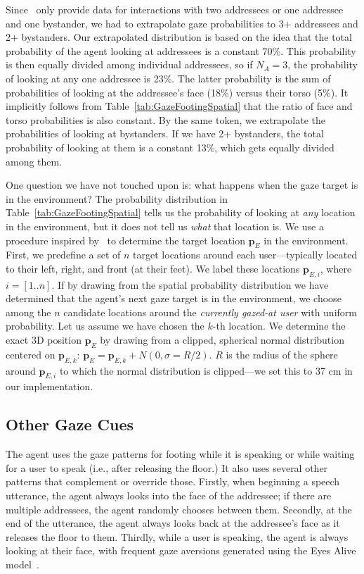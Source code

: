 Since~\citet{mutlu2012conversational} only provide data for interactions with two addressees or one addressee and one bystander, we had to extrapolate gaze probabilities to 3+ addressees and 2+ bystanders. Our extrapolated distribution is based on the idea that the total probability of the agent looking at addressees is a constant 70\%. This probability is then equally divided among individual addressees, so if $N_A = 3$, the probability of looking at any one addressee is 23\%. The latter probability is the sum of probabilities of looking at the addressee's face (18\%) versus their torso (5\%). It implicitly follows from Table~\ref{tab:GazeFootingSpatial} that the ratio of face and torso probabilities is also constant. By the same token, we extrapolate the probabilities of looking at bystanders. If we have 2+ bystanders, the total probability of looking at them is a constant 13\%, which gets equally divided among them.

One question we have not touched upon is: what happens when the gaze target is in the environment? The probability distribution in Table~\ref{tab:GazeFootingSpatial} tells us the probability of looking at \emph{any} location in the environment, but it does not tell us \emph{what} that location is. We use a procedure inspired by~\citep{mutlu2012conversational} to determine the target location $\mathbf{p}_E$ in the environment. First, we predefine a set of $n$ target locations around each user---typically located to their left, right, and front (at their feet). We label these locations $\mathbf{p}_{E,i}$, where $i = [1..n]$. If by drawing from the spatial probability distribution we have determined that the agent's next gaze target is in the environment, we choose among the $n$ candidate locations around the \emph{currently gazed-at user} with uniform probability. Let us assume we have chosen the $k$-th location. We determine the exact 3D position $\mathbf{p}_E$ by drawing from a clipped, spherical normal distribution centered on $\mathbf{p}_{E,k}$: $\mathbf{p}_E = \mathbf{p}_{E,k} + N(0, \sigma = R/2)$. $R$ is the radius of the sphere around $\mathbf{p}_{E,i}$ to which the normal distribution is clipped---we set this to 37 cm in our implementation.

\subsection{Other Gaze Cues}

The agent uses the gaze patterns for footing while it is speaking or while waiting for a user to speak (i.e., after releasing the floor.) It also uses several other patterns that complement or override those. Firstly, when beginning a speech utterance, the agent always looks into the face of the addressee; if there are multiple addressees, the agent randomly chooses between them. Secondly, at the end of the utterance, the agent always looks back at the addressee's face as it releases the floor to them. Thirdly, while a user is speaking, the agent is always looking at their face, with frequent gaze aversions generated using the Eyes Alive model~\citep{lee2002eyes}. 